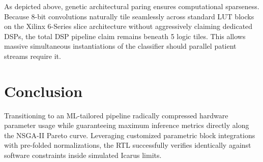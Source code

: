 \documentclass[11pt,a4paper,twocolumn]{article}
\begin{document}
As depicted above, genetic architectural paring ensures computational sparseness. Because 8-bit convolutions naturally tile seamlessly across standard LUT blocks on the Xilinx 6-Series slice architecture without aggressively claiming dedicated DSPs, the total DSP pipeline claim remains beneath 5 logic tiles. This allows massive simultaneous instantiations of the classifier should parallel patient streams require it.

\section{Conclusion}
Transitioning to an ML-tailored pipeline radically compressed hardware parameter usage while guaranteeing maximum inference metrics directly along the NSGA-II Pareto curve. Leveraging customized parametric block integrations with pre-folded normalizations, the RTL successfully verifies identically against software constraints inside simulated Icarus limits.
\end{document}
